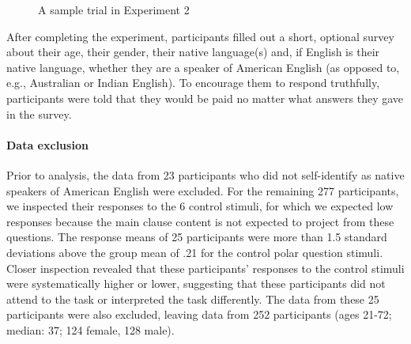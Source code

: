 \documentclass[11pt,fleqn]{article}
\newcommand{\6}{\mbox{$[\hspace*{-.6mm}[$}}
\newcommand{\9}{\mbox{$]\hspace*{-.6mm}]$}}
\begin{document}
\begin{figure}[h!]
\begin{center}
\end{center}
\caption{A sample trial in Experiment 2}\label{f-trial-exp3}
\end{figure}

After completing the experiment, participants filled out a short, optional survey about their age, their gender, their native language(s) and, if English is their native language, whether they are a speaker of American English (as opposed to, e.g., Australian or Indian English). To encourage them to respond truthfully, participants were told that they would be paid no matter what answers they gave in the survey.

\paragraph{Data exclusion}
Prior to analysis, the data from 23 participants who did not self-identify as native speakers of American English were excluded. For the remaining 277 participants, we inspected their responses to the 6 control stimuli, for which we expected low responses because the main clause content is not expected to project from these questions. The response means of 25 participants were more than 1.5 standard deviations above the group mean of .21 for the control polar question stimuli. Closer inspection revealed that these participants' responses to the control stimuli were systematically higher or lower, suggesting that these participants did not attend to the task or interpreted the task differently. The data from these 25 participants were also excluded, leaving data from 252 participants (ages 21-72; median: 37; 124 female, 128 male).
\end{document}
